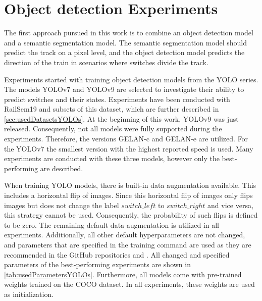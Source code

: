 \section{Object detection Experiments}

The first approach pursued in this work is to combine an object detection model and a semantic segmentation model.
The semantic segmentation model should predict the track on a pixel level, and the object detection model predicts the direction of the train in scenarios where switches divide the track.

Experiments started with training object detection models from the \ac{YOLO} series.
The models \ac{YOLO}v7 \cite{yolov7} and \ac{YOLO}v9 \cite{YOLOv9} are selected to investigate their ability to predict switches and their states.
Experiments have been conducted with RailSem19 and subsets of this dataset, which are further described in \autoref{sec:usedDatasetsYOLOs}.
At the beginning of this work, \ac{YOLO}v9 was just released.
Consequently, not all models were fully supported during the experiments.
Therefore, the versions \ac{GELAN}-c and \ac{GELAN}-e are utilized.
For the \ac{YOLO}v7 the smallest version with the highest reported speed is used.
Many experiments are conducted with these three models, however only the best-performing are described.

When training \ac{YOLO} models, there is built-in data augmentation available.
This includes a horizontal flip of images.
Since this horizontal flip of images only flips images but does not change the label $switch\_left$ to $switch\_right$ and vice versa, this strategy cannot be used.
Consequently, the probability of such flips is defined to be zero. The remaining default data augmentation is utilized in all experiments.
Additionally, all other default hyperparameters are not changed, and parameters that are specified in the training command are used as they are recommended in the GitHub repositories \cite{YOLOv7GitHub} and \cite{YOLOv9GitHub}.
All changed and specified parameters of the best-performing experiments are shown in \autoref{tab:usedParametersYOLOs}.
Furthermore, all models come with pre-trained weights trained on the COCO dataset.
In all experiments, these weights are used as initialization.

